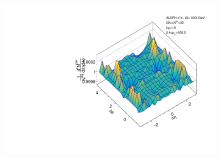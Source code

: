 \begin{figure}[htbp]
\begin{minipage}[b]{0.32\linewidth}
  \end{minipage}
  \begin{minipage}[b]{0.32\linewidth}
    \centering
    \includegraphics[width=\linewidth]{images/TwoParticleCorrelation/LEP2_BEAM/LEP2_BEAM_r_ratio_20_30.pdf}
    \label{fig:LEP2 Beam Axis, Ratio Plot, Multiplicity 20-30, Ratio}
  \end{minipage}
\end{figure}

